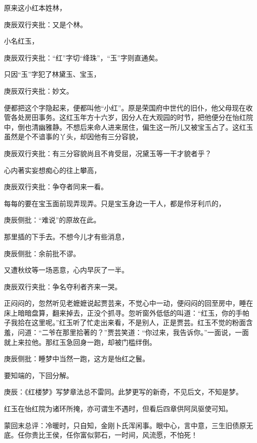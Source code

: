\begin{parag}


    原来这小红本姓林，\begin{note}庚辰双行夹批：又是个林。\end{note}小名红玉，\begin{note}庚辰双行夹批：“红”字切“绛珠”，“玉”字则直通矣。\end{note}只因“玉”字犯了林黛玉、宝玉，\begin{note}庚辰双行夹批：妙文。\end{note}便都把这个字隐起来，便都叫他“小红”。原是荣国府中世代的旧仆，他父母现在收管各处房田事务。这红玉年方十六岁，因分人在大观园的时节，把他便分在怡红院中，倒也清幽雅静。不想后来命人进来居住，偏生这一所儿又被宝玉占了。这红玉虽然是个不谙事的丫头，却因他有三分容貌，\begin{note}庚辰双行夹批：有三分容貌尚且不肯受屈，况黛玉等一干才貌者乎？\end{note}心内著实妄想痴心的往上攀高，\begin{note}庚辰双行夹批：争夺者同来一看。\end{note}每每的要在宝玉面前现弄现弄。只是宝玉身边一干人，都是伶牙利爪的，\begin{note}庚辰侧批：“难说”的原故在此。\end{note}那里插的下手去。不想今儿才有些消息，\begin{note}庚辰侧批：余前批不谬。\end{note}又遭秋纹等一场恶意，心内早灰了一半。\begin{note}庚辰双行夹批：争名夺利者齐来一哭。\end{note}正闷闷的，忽然听见老嬷嬷说起贾芸来，不觉心中一动，便闷闷的回至房中，睡在床上暗暗盘算，翻来掉去，正没个抓寻。忽听窗外低低的叫道：“红玉，你的手帕子我拾在这里呢。”红玉听了忙走出来看，不是别人，正是贾芸。红玉不觉的粉面含羞，问道：“二爷在那里拾著的？”贾芸笑道：“你过来，我告诉你。”一面说，一面就上来拉他。那红玉急回身一跑，却被门槛绊倒。\begin{note}庚辰侧批：睡梦中当然一跑，这方是怡红之鬟。\end{note}要知端的，下回分解。
\end{parag}

\begin{parag}

    \begin{note}庚辰：《红楼梦》写梦章法总不雷同。此梦更写的新奇，不见后文，不知是梦。\end{note}
\end{parag}


\begin{parag}


    \begin{note}红玉在怡红院为诸环所掩，亦可谓生不遇时，但看后四章供阿凤驱使可知。\end{note}
\end{parag}


\begin{parag}


    \begin{note}蒙回末总评：冷暖时，只自知，金刚卜氏浑闲事。眼中心，言中意，三生旧债原无底。任你贵比王侯，任你富似郭石，一时间，风流愿，不怕死！\end{note}
\end{parag}

